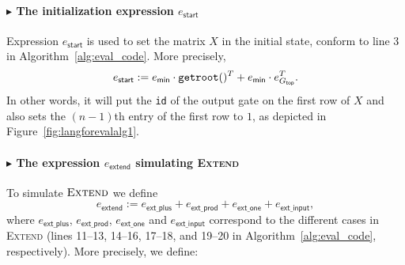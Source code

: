 \paragraph{$\blacktriangleright$ The initialization expression $e_{\mathsf{start}}$}
Expression $e_{\mathsf{start}}$ is used to set the matrix $X$ in the initial state, conform to line 3 in Algorithm~\ref{alg:eval_code}. More precisely,
$$e_{\mathsf{start}}:=e_{\mathsf{min}}\cdot \texttt{getroot}()^T + e_{\mathsf{min}}\cdot e_{G_{\mathsf{top}}}^T.$$
In other words, it will put the \texttt{id} of the output gate on the first row of $X$ and also sets the $(n-1)$th entry  of the first row to $1$,
as depicted in Figure~\ref{fig:langforevalalg1}. 

\paragraph{$\blacktriangleright$ The expression $e_{\mathsf{extend}}$ simulating {\normalfont\textsc{Extend}}}
To simulate $\textsc{Extend}$ we define
$$
e_{\mathsf{extend}}:=e_{\mathsf{ext\_plus}}+e_{\mathsf{ext\_prod}}+e_{\mathsf{ext\_one}}+e_{\mathsf{ext\_input}},
$$
where  $e_{\mathsf{ext\_plus}}$, $e_{\mathsf{ext\_prod}}$, $e_{\mathsf{ext\_one}}$ and $e_{\mathsf{ext\_input}}$ correspond to the different cases in \textsc{Extend} (lines 11--13, 14--16, 17--18, and 19--20 in Algorithm~\ref{alg:eval_code}, respectively). More precisely, we define:
